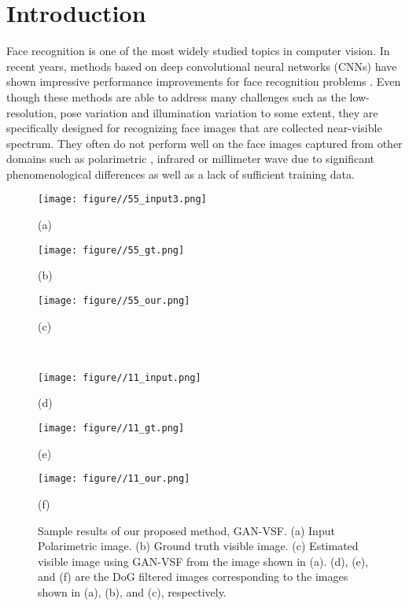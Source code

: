\documentclass[10pt,twocolumn,letterpaper]{article}
\begin{document}
\section{Introduction}
Face recognition is one of the most widely studied topics in computer vision.  In recent years,
methods based on deep convolutional neural networks (CNNs) have shown impressive performance improvements for face recognition problems \cite{vggface,face_net,face_residue}.   Even though these methods are able to address many challenges such as the low-resolution, pose variation and illumination variation to some extent, they are specifically designed for recognizing face images that are collected near-visible spectrum.  They often do not perform well on the face images captured from other domains such as polarimetric \cite{ ijcb_datasets2, btas_2016, ijcb_datasets}, infrared \cite{Klare_NIR, SWIR_TIFS} or millimeter wave \cite{mmW_ISBA2017} due to significant phenomenological differences as well as a lack of sufficient training data. 
\begin{figure}[t]
	\centering
		\begin{minipage}{.15\textwidth}
			\centering
			\texttt{[image: figure//55\_input3.png]}
			\captionsetup{labelformat=empty}
			\captionsetup{justification=centering}
			\caption*{(a)}
	\end{minipage}
	\begin{minipage}{.15\textwidth}
		\centering
		\texttt{[image: figure//55\_gt.png]}
		\captionsetup{labelformat=empty}
		\captionsetup{justification=centering}
		\caption*{(b)}
	\end{minipage}
	\begin{minipage}{.15\textwidth}
		\centering
		\texttt{[image: figure//55\_our.png]}
		\captionsetup{labelformat=empty}
		\captionsetup{justification=centering}
    	\caption*{(c)}
	\end{minipage}\\
	\begin{minipage}{.15\textwidth}
			\centering
			\texttt{[image: figure//11\_input.png]}
			\captionsetup{labelformat=empty}
			\captionsetup{justification=centering}
			\caption*{(d)}
	\end{minipage}
	\begin{minipage}{.15\textwidth}
		\centering
		\texttt{[image: figure//11\_gt.png]}
		\captionsetup{labelformat=empty}
		\captionsetup{justification=centering}
		\caption*{(e)}
	\end{minipage}
	\begin{minipage}{.15\textwidth}
		\centering
		\texttt{[image: figure//11\_our.png]}
		\captionsetup{labelformat=empty}
		\captionsetup{justification=centering}
    	\caption*{(f)}
	\end{minipage}	
	\vskip -8pt
	\caption{Sample results of our proposed method, GAN-VSF. (a) Input Polarimetric image.  (b) Ground truth visible image.  (c)  Estimated visible image using GAN-VSF from the image shown in (a).  (d), (e), and (f) are the DoG filtered images corresponding to the images shown in (a), (b), and (c), respectively.}  \label{fig:over}
\end{figure}
\end{document}
